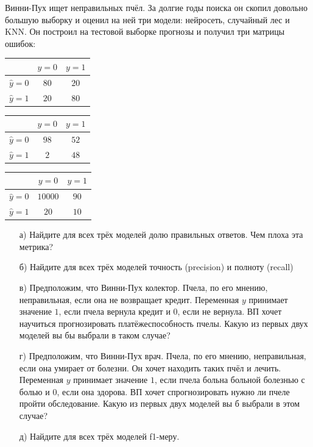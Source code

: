 \documentclass[12pt, a4paper, oneside]{article}
\theoremstyle{plain} %
\theoremstyle{definition}
\newcounter{problem}%
\renewcommand{\theproblem}{\arabic{problem}}
\newenvironment{problem}{
\addtocounter{problem}{1}\noindent{ \color{titleblue} \large \bfseries Упражнение~\theproblem \vspace{1ex} \newline}
}{ }
\begin{document}
\begin{problem}
Винни-Пух ищет неправильных пчёл. За долгие годы поиска он скопил довольно большую выборку и оценил на ней три модели: нейросеть, случайный лес и KNN. Он построил на тестовой выборке прогнозы и получил три матрицы ошибок: 

\begin{minipage}[t]{0.3\linewidth}
	\begin{tabular}{|c|c|c|}
		\hline
		& $y=0$  &  $ y = 1$ \\  \hline 
		$\hat y = 0$  &   $80$ &    $20$ \\      \hline 
		$\hat y = 1$ &   $20$ &     $80$ \\      \hline 	
	\end{tabular}
\end{minipage}
\hfill
\begin{minipage}[t]{0.3\linewidth}
	\begin{tabular}{|c|c|c|}
		\hline
		& $y=0$  &  $ y = 1$ \\  \hline 
		$\hat y = 0$  &   $98$ &    $52$ \\      \hline 
		$\hat y = 1$ &   $2$ &     $48$ \\      \hline 		
	\end{tabular}
\end{minipage}
\hfill
\begin{minipage}[t]{0.3\linewidth}
	\begin{tabular}{|c|c|c|}
		\hline
		& $y=0$  &  $ y = 1$ \\  \hline 
		$\hat y = 0$  &   $10000$ &    $90$ \\      \hline 
		$\hat y = 1$ &   $20$ &     $10$ \\      \hline 
	\end{tabular}
\end{minipage}

\begin{enumerate}
	\item[а)]   Найдите для всех трёх моделей долю правильных ответов. Чем плоха эта метрика? 
	\item[б)]   Найдите для всех трёх моделей точность (precision) и полноту (recall)
	\item[в)]   Предположим, что Винни-Пух колектор. Пчела, по его мнению, неправильная, если она не возвращает кредит. Переменная $y$ принимает значение $1$, если пчела вернула кредит  и $0$, если не вернула. ВП хочет научиться прогнозировать платёжеспособность пчелы. Какую из первых двух моделей вы бы выбрали в таком случае? 
	\item[г)]  Предположим, что Винни-Пух врач. Пчела, по его мнению, неправильная, если она умирает от болезни. Он хочет находить таких пчёл и лечить. Переменная $y$ принимает значение $1$, если пчела больна больной болезнью с болью и $0$, если она здорова. ВП хочет спрогнозировать нужно ли пчеле пройти обследование. Какую из первых двух моделей вы б выбрали в этом случае? 
	\item[д)] Найдите для всех трёх моделей f1-меру. 
\end{enumerate}
\end{problem}
\end{document}

